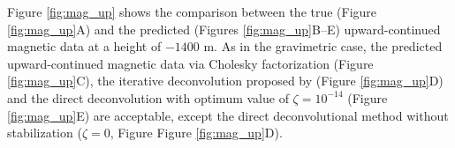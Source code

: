 Figure \ref{fig:mag_up} shows the comparison between the true
(Figure \ref{fig:mag_up}A)  and the predicted  (Figures \ref{fig:mag_up}B--E) upward-continued magnetic data at a height of $-1400$ m. 
As in the gravimetric case, the predicted upward-continued magnetic data via Cholesky factorization (Figure \ref{fig:mag_up}C),  the iterative deconvolution proposed by \cite{takahashi-etal2020} (Figure \ref{fig:mag_up}D) and the direct deconvolution with optimum value of  $\zeta = 10^{-14}$  
(Figure \ref{fig:mag_up}E) are acceptable, except the direct deconvolutional method without stabilization ($\zeta = 0$, Figure Figure \ref{fig:mag_up}D).

%
%
%
%
